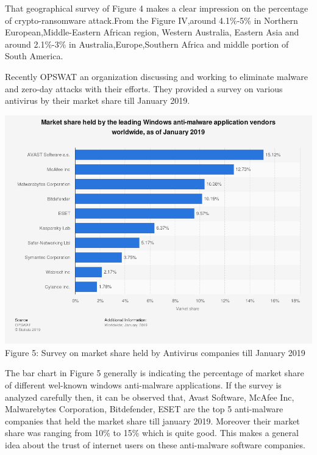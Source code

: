 \documentclass[conference]{IEEEtran}
\begin{document}
	That geographical survey of Figure 4 makes a clear impression on the percentage of crypto-ransomware attack.From the Figure IV,around 4.1\%-5\% in Northern European,Middle-Eastern African region, Western Australia, Eastern Asia and around 2.1\%-3\% in Australia,Europe,Southern Africa and middle portion of South America.  
	
	
	Recently OPSWAT an organization discussing and working to eliminate malware and zero-day attacks with their efforts. They provided a survey on various antivirus by their market share till January 2019. 
	
	
	\begin{center}
		\includegraphics[scale=0.22]{antivsurvey.png}\\
		{\footnotesize Figure 5: Survey on market share held by Antivirus companies till January 2019~\autocite{r14}}
	\end{center}
	
	The bar chart in Figure 5 generally is indicating the percentage of market share of different wel-known windows anti-malware applications. If the survey is analyzed carefully then, it can be observed that, Avast Software, McAfee Inc, Malwarebytes Corporation, Bitdefender, ESET are the top 5 anti-malware companies that held the market share till january 2019. Moreover their market share was ranging from 10\% to 15\% which is quite good. This makes a general idea about the trust of internet users on these anti-malware software companies.\\
	
\end{document}
